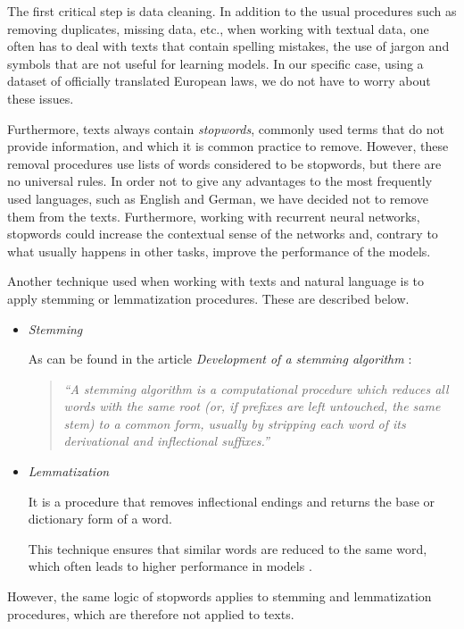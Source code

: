 \documentclass[letterpaper,11pt]{article}
\begin{document}
The first critical step is data cleaning. In addition to the usual procedures such as removing duplicates, missing data, etc., when working with textual data, one often has to deal with texts that contain spelling mistakes, the use of jargon and symbols that are not useful for learning models. In our specific case, using a dataset of officially translated European laws, we do not have to worry about these issues. 

Furthermore, texts always contain \textit{stopwords}, commonly used terms that do not provide information, and which it is common practice to remove. However, these removal procedures use lists of words considered to be stopwords, but there are no universal rules. In order not to give any advantages to the most frequently used languages, such as English and German, we have decided not to remove them from the texts. Furthermore, working with recurrent neural networks, stopwords could increase the contextual sense of the networks and, contrary to what usually happens in other tasks, improve the performance of the models.

Another technique used when working with texts and natural language is to apply stemming or lemmatization procedures. These are described below.
\begin{itemize}
  \item \textit{Stemming}
  
  As can be found in the article \textit{Development of a stemming algorithm} \cite{lovins1968development}:
  \begin{quote}
    \textit{``A stemming algorithm is a computational procedure which reduces all words with the same root (or, if prefixes are left untouched, the same stem) to a common form, usually by stripping each word of its derivational and inflectional suffixes.''}
  \end{quote}
  
    \item \textit{Lemmatization}
  
  It is a procedure that removes inflectional endings and returns the base or dictionary form of a word.

  This technique ensures that similar words are reduced to the same word, which often leads to higher performance in models \cite{balakrishnan2014stemming}. 

\end{itemize}

However, the same logic of stopwords applies to {stemming} and {lemmatization} procedures, which are therefore not applied to texts.
\end{document}
